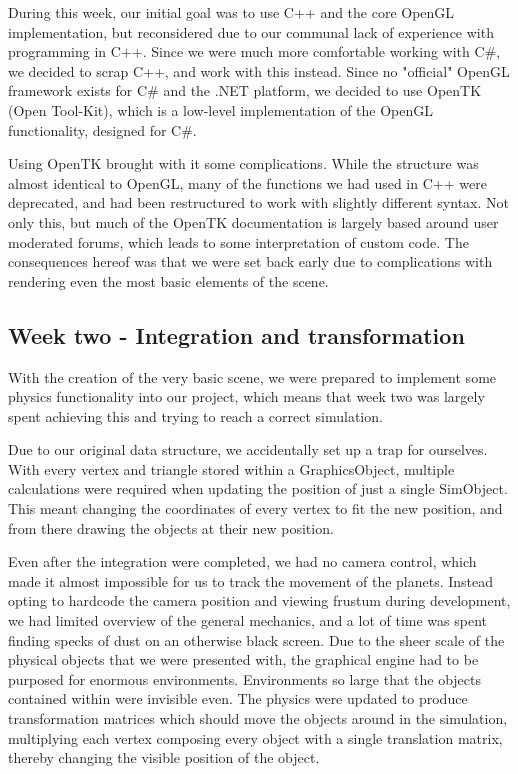 During this week, our initial goal was to use C++ and the core OpenGL implementation, but reconsidered due to our communal lack of experience with programming in C++. Since we were much more comfortable working with C\#, we decided to scrap C++, and work with this instead. Since no "official" OpenGL framework exists for C\# and the .NET platform, we decided to use OpenTK (Open Tool-Kit), which is a low-level implementation of the OpenGL functionality, designed for C\#.

Using OpenTK brought with it some complications. While the structure was almost identical to OpenGL, many of the functions we had used in C++ were deprecated, and had been restructured to work with slightly different syntax. Not only this, but much of the OpenTK documentation is largely based around user moderated forums, which leads to some interpretation of custom code. The consequences hereof was that we were set back early due to complications with rendering even the most basic elements of the scene.

\subsection{Week two - Integration and transformation}
With the creation of the very basic scene, we were prepared to implement some physics functionality into our project, which means that week two was largely spent achieving this and trying to reach a correct simulation.

Due to our original data structure, we accidentally set up a trap for ourselves. With every vertex and triangle stored within a GraphicsObject, multiple calculations were required when updating the position of just a single SimObject. This meant changing the coordinates of every vertex to fit the new position, and from there drawing the objects at their new position.

Even after the integration were completed, we had no camera control, which made it almost impossible for us to track the movement of the planets. Instead opting to hardcode the camera position and viewing frustum during development, we had limited overview of the general mechanics, and a lot of time was spent finding specks of dust on an otherwise black screen. Due to the sheer scale of the physical objects that we were presented with, the graphical engine had to be purposed for enormous environments. Environments so large that the objects contained within were invisible even.
The physics were updated to produce transformation matrices which should move the objects around in the simulation, multiplying each vertex composing every object with a single translation matrix, thereby changing the visible position of the object.

